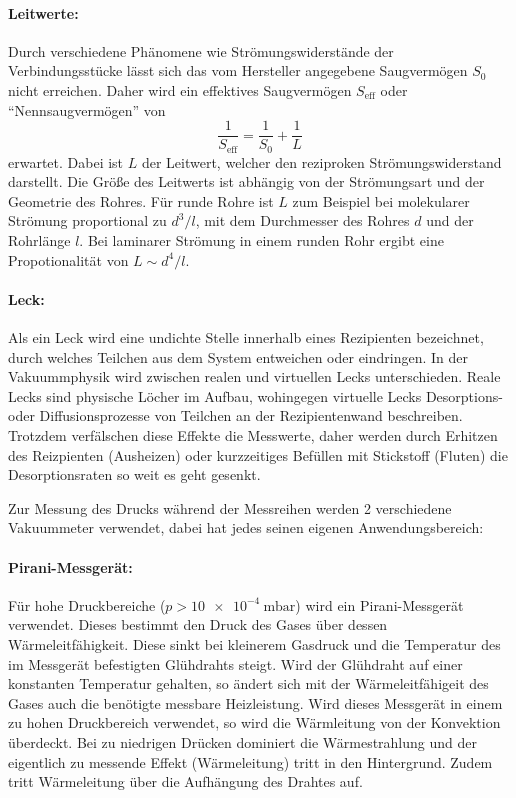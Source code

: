 \paragraph{Leitwerte:}
Durch verschiedene Phänomene wie Strömungswiderstände der Verbindungsstücke
lässt sich das vom Hersteller angegebene Saugvermögen $S_0$ nicht erreichen.
Daher wird ein effektives Saugvermögen $S_\text{eff}$ oder \enquote{Nennsaugvermögen} von
\begin{equation}
   \frac{1}{S_\text{eff}} = \frac{1}{S_0} + \frac{1}{L}
   \label{eqn:effSaug}
\end{equation}
erwartet.
Dabei ist $L$ der Leitwert, welcher den reziproken Strömungswiderstand darstellt.
Die Größe des Leitwerts ist abhängig von der Strömungsart und der Geometrie
des Rohres.
Für runde Rohre ist $L$ zum Beispiel bei molekularer Strömung proportional zu
$d^3 /l$, mit dem Durchmesser des Rohres $d$ und der Rohrlänge $l$.
Bei laminarer Strömung in einem runden Rohr ergibt eine Propotionalität von
$L \sim d^4 / l$.

\paragraph{Leck:}
Als ein Leck wird eine undichte Stelle innerhalb eines Rezipienten bezeichnet,
durch welches Teilchen aus dem System entweichen oder eindringen.
In der Vakuummphysik wird zwischen realen und virtuellen Lecks unterschieden.
Reale Lecks sind physische Löcher im Aufbau,
wohingegen virtuelle Lecks Desorptions- oder Diffusionsprozesse von Teilchen an der
Rezipientenwand beschreiben.
Trotzdem verfälschen diese Effekte die Messwerte,
daher werden durch Erhitzen des Reizpienten (Ausheizen)
oder kurzzeitiges Befüllen mit Stickstoff (Fluten) die Desorptionsraten so weit es geht gesenkt.

Zur Messung des Drucks während der Messreihen werden 2 verschiedene Vakuummeter verwendet,
dabei hat jedes seinen eigenen Anwendungsbereich:

\paragraph{Pirani-Messgerät:}
Für hohe Druckbereiche ($p > \SI{10e-4}{\milli\bar}$) wird ein Pirani-Messgerät verwendet.
Dieses bestimmt den Druck des Gases über dessen Wärmeleitfähigkeit.
Diese sinkt bei kleinerem Gasdruck und die Temperatur des im Messgerät befestigten Glühdrahts steigt.
Wird der Glühdraht auf einer konstanten Temperatur gehalten,
so ändert sich mit der Wärmeleitfähigeit des Gases auch die benötigte messbare Heizleistung.
Wird dieses Messgerät in einem zu hohen Druckbereich verwendet,
so wird die Wärmleitung von der Konvektion überdeckt.
Bei zu niedrigen Drücken dominiert die Wärmestrahlung
und der eigentlich zu messende Effekt (Wärmeleitung) tritt in den Hintergrund.
Zudem tritt Wärmeleitung über die Aufhängung des Drahtes auf.


